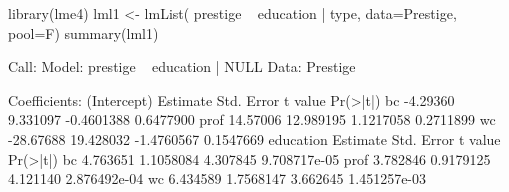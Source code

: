 \begin{Schunk}
\begin{Sinput}
 library(lme4)
 lml1 <- lmList( prestige ~ education | type, data=Prestige, pool=F)
 summary(lml1)
\end{Sinput}
\begin{Soutput}
Call:
  Model: prestige ~ education | NULL 
   Data: Prestige 

Coefficients:
   (Intercept) 
      Estimate Std. Error    t value  Pr(>|t|)
bc    -4.29360   9.331097 -0.4601388 0.6477900
prof  14.57006  12.989195  1.1217058 0.2711899
wc   -28.67688  19.428032 -1.4760567 0.1547669
   education 
     Estimate Std. Error  t value     Pr(>|t|)
bc   4.763651  1.1058084 4.307845 9.708717e-05
prof 3.782846  0.9179125 4.121140 2.876492e-04
wc   6.434589  1.7568147 3.662645 1.451257e-03
\end{Soutput}
\end{Schunk}
